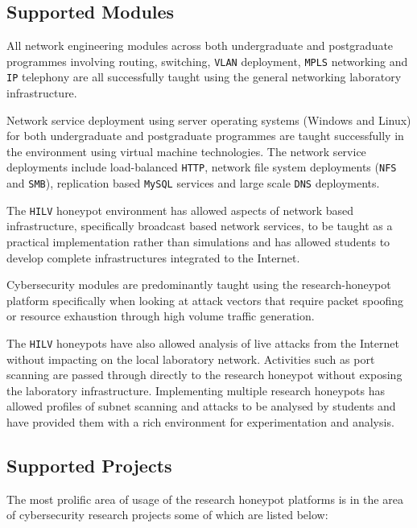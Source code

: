 \documentclass{llncs}
\begin{document}
\subsection{Supported Modules\label{Modules}}

All network engineering modules across both undergraduate and postgraduate
programmes involving routing, switching, \texttt{VLAN} deployment,
\texttt{MPLS} networking and \texttt{IP} telephony are all successfully taught
using the general networking laboratory infrastructure.

Network service deployment using server operating systems (Windows and Linux)
for both undergraduate and postgraduate programmes are taught successfully in
the environment using virtual machine technologies. The network service
deployments include load-balanced \texttt{HTTP}, network file system
deployments (\texttt{NFS} and \texttt{SMB}), replication based \texttt{MySQL}
services and large scale \texttt{DNS} deployments.

The \texttt{HILV} honeypot environment has allowed aspects of network based
infrastructure, specifically broadcast based network services, to be taught as
a practical implementation rather than simulations and has allowed students to
develop complete infrastructures integrated to the Internet.

Cybersecurity modules are predominantly taught using the research-honeypot
platform specifically when looking at attack vectors that require packet
spoofing or resource exhaustion through high volume traffic generation.

The \texttt{HILV} honeypots have also allowed analysis of live attacks from the
Internet without impacting on the local laboratory network. Activities such as
port scanning are passed through directly to the research honeypot without
exposing the laboratory infrastructure. Implementing multiple research
honeypots has allowed profiles of subnet scanning and attacks to be analysed by
students and have provided them with a rich environment for experimentation and
analysis.

\subsection{Supported Projects\label{Projects}}

The most prolific area of usage of the research honeypot platforms is in the
area of cybersecurity research projects some of which are listed below:
\end{document}
